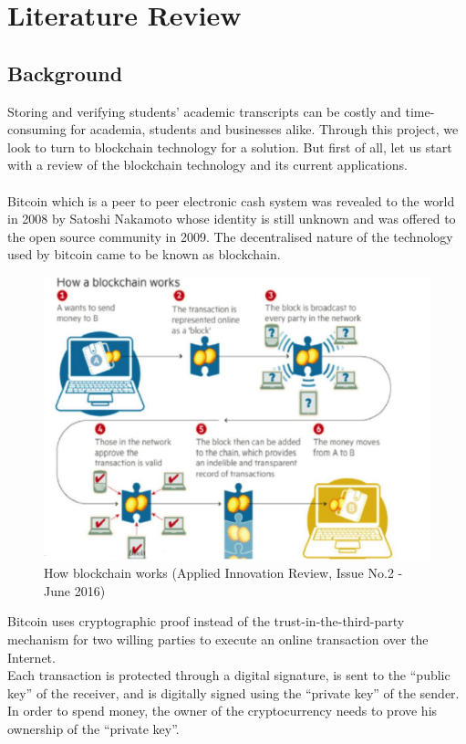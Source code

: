 \chapter{Literature Review}

\section{Background}

Storing and verifying students' academic transcripts can be costly and time-consuming for academia, students and businesses alike. Through this project, we look to turn to blockchain technology for a solution. But first of all, let us start with a review of the blockchain technology and its current applications.\\\\
Bitcoin which is a peer to peer electronic cash system was revealed to the world in 2008 by Satoshi Nakamoto whose identity is still unknown and was offered to the open source community in 2009. The decentralised nature of the technology used by bitcoin came to be known as blockchain.\\
\begin{figure}[!h]
\centering
\includegraphics[scale=0.3]{images/howitworks.jpg}
\caption{How blockchain works (Applied Innovation Review, Issue No.2 - June 2016)}
\end{figure}
Bitcoin uses cryptographic proof instead of the trust-in-the-third-party mechanism for two willing parties to execute an online transaction over the Internet.\\
Each transaction is protected through a digital signature, is sent to the “public key” of the receiver, and is digitally signed using the “private key” of the sender. In order to spend money, the owner of the cryptocurrency needs to prove his ownership of the “private key”.\\
